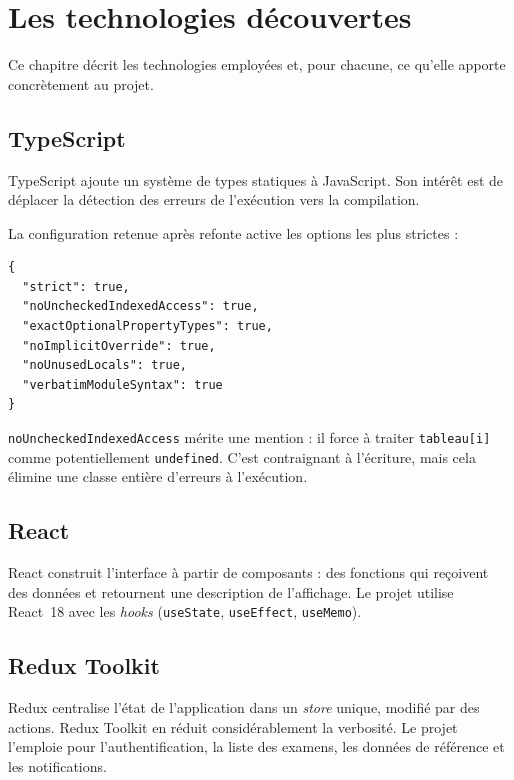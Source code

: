 \documentclass[11pt,a4paper]{report}
\begin{document}
\chapter{Les technologies découvertes}

Ce chapitre décrit les technologies employées et, pour chacune, ce qu'elle apporte
concrètement au projet.

\section{TypeScript}

TypeScript ajoute un système de types statiques à JavaScript. Son intérêt est de
déplacer la détection des erreurs de l'exécution vers la compilation.

La configuration retenue après refonte active les options les plus strictes :

\begin{lstlisting}[style=ts,caption={Options de compilation, \texttt{tsconfig.json}}]
{
  "strict": true,
  "noUncheckedIndexedAccess": true,
  "exactOptionalPropertyTypes": true,
  "noImplicitOverride": true,
  "noUnusedLocals": true,
  "verbatimModuleSyntax": true
}
\end{lstlisting}

\texttt{noUncheckedIndexedAccess} mérite une mention : il force à traiter
\texttt{tableau[i]} comme potentiellement \texttt{undefined}. C'est contraignant à
l'écriture, mais cela élimine une classe entière d'erreurs à l'exécution.

\section{React}

React construit l'interface à partir de composants : des fonctions qui reçoivent
des données et retournent une description de l'affichage. Le projet utilise React~18
avec les \emph{hooks} (\texttt{useState}, \texttt{useEffect}, \texttt{useMemo}).

\section{Redux Toolkit}

Redux centralise l'état de l'application dans un \emph{store} unique, modifié par
des actions. Redux Toolkit en réduit considérablement la verbosité. Le projet
l'emploie pour l'authentification, la liste des examens, les données de référence
et les notifications.
\end{document}
